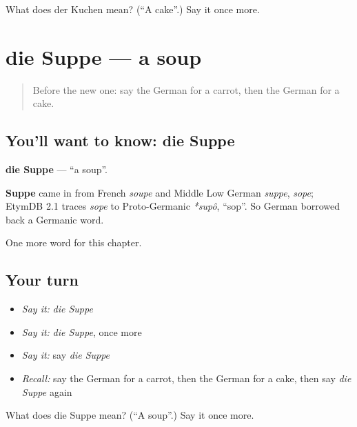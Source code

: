 \begin{tcolorbox}[breakable,colback=teal!4,colframe=teal!35!black,title={Before you move on}]
What does der Kuchen mean? (\textquotedblleft{}A cake\textquotedblright{}.) Say it once more.
\end{tcolorbox}
\section[die Suppe]{die Suppe — a soup}

\label{lesson:GE-C71-suppe}



\begin{quote}
Before the new one: say the German for a carrot, then the German for a cake.
\end{quote}

\subsection*{You'll want to know: die Suppe}
\textbf{die Suppe} — \textquotedblleft{}a soup\textquotedblright{}.

\begin{cousinweb}
\textbf{Suppe} came in from French \emph{soupe} and Middle Low German \emph{suppe}, \emph{sope}; EtymDB 2.1 traces \emph{sope} to Proto-Germanic \emph{*supô}, \textquotedblleft{}sop\textquotedblright{}. So German borrowed back a Germanic word.
\end{cousinweb}

\begin{grammarlens}[title={What you've built}]
One more word for this chapter.
\end{grammarlens}

\subsection*{Your turn}
\begin{itemize}
\raggedright
  \item \emph{Say it:} \emph{die Suppe}
  \item \emph{Say it:} \emph{die Suppe}, once more
  \item \emph{Say it:} say \emph{die Suppe}
  \item \emph{Recall:} say the German for a carrot, then the German for a cake, then say \emph{die Suppe} again
\end{itemize}

\begin{tcolorbox}[breakable,colback=teal!4,colframe=teal!35!black,title={Before you move on}]
What does die Suppe mean? (\textquotedblleft{}A soup\textquotedblright{}.) Say it once more.
\end{tcolorbox}
